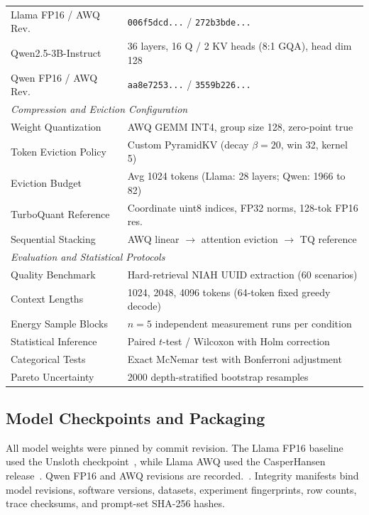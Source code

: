 \documentclass[sigconf,nonacm]{acmart}
\begin{document}
\begin{itemize}
\begin{table}[htbp]
{\begin{tabular}{@{}ll@{}}
Llama FP16 / AWQ Rev. & \texttt{006f5dcd...} / \texttt{272b3bde...} \\
Qwen2.5-3B-Instruct & 36 layers, 16 Q / 2 KV heads (8:1 GQA), head dim 128 \\
Qwen FP16 / AWQ Rev. & \texttt{aa8e7253...} / \texttt{3559b226...} \\
\midrule
\multicolumn{2}{l}{\textit{Compression and Eviction Configuration}} \\
Weight Quantization & AWQ GEMM INT4, group size 128, zero-point true \\
Token Eviction Policy & Custom PyramidKV (decay $\beta=20$, win 32, kernel 5) \\
Eviction Budget & Avg 1024 tokens (Llama: 28 layers; Qwen: 1966 to 82) \\
TurboQuant Reference & Coordinate uint8 indices, FP32 norms, 128-tok FP16 res. \\
Sequential Stacking & AWQ linear $\to$ attention eviction $\to$ TQ reference \\
\midrule
\multicolumn{2}{l}{\textit{Evaluation and Statistical Protocols}} \\
Quality Benchmark & Hard-retrieval NIAH UUID extraction (60 scenarios) \\
Context Lengths & 1024, 2048, 4096 tokens (64-token fixed greedy decode) \\
Energy Sample Blocks & $n=5$ independent measurement runs per condition \\
Statistical Inference & Paired $t$-test / Wilcoxon with Holm correction \\
Categorical Tests & Exact McNemar test with Bonferroni adjustment \\
Pareto Uncertainty & 2000 depth-stratified bootstrap resamples \\
\bottomrule
\end{tabular}}
\end{table}

\subsection{Model Checkpoints and Packaging}
\begingroup\raggedright
All model weights were pinned by commit revision. The Llama FP16 baseline used
the Unsloth checkpoint~\cite{unsloth_2024}, while Llama AWQ used the
CasperHansen release~\cite{casperhansen_llama32_awq}. Qwen FP16 and AWQ revisions are recorded.~\cite{qwen2024technical}.
Integrity manifests bind model revisions, software versions, datasets, experiment
fingerprints, row counts, trace checksums, and prompt-set SHA-256 hashes.
\par\endgroup


\end{itemize}
\end{document}
